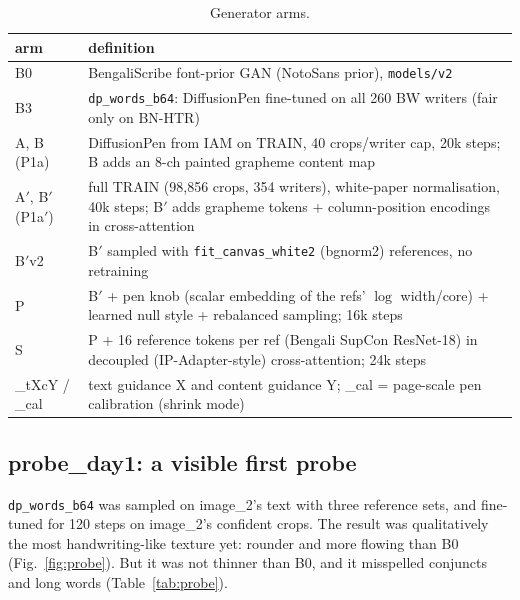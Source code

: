 \documentclass[10.5pt,a4paper]{article}
\newcommand{\Bp}{B$'$}
\newcommand{\Ap}{A$'$}
\begin{document}
\begin{table}[H]
\centering
\caption{Generator arms.}
\label{tab:armlist}
\small
\begin{tabular}{@{}lp{12.6cm}@{}}
\toprule
arm & definition \\
\midrule
B0 & BengaliScribe font-prior GAN (NotoSans prior), \texttt{models/v2} \\
B3 & \texttt{dp\_words\_b64}: DiffusionPen fine-tuned on all 260 BW writers (fair only on BN-HTR) \\
A, B (P1a) & DiffusionPen from IAM on TRAIN, 40 crops/writer cap, 20k steps; B adds an 8-ch painted grapheme content map \\
\Ap, \Bp{} (P1a$'$) & full TRAIN (98,856 crops, 354 writers), white-paper normalisation, 40k steps; \Bp{} adds grapheme tokens + column-position encodings in cross-attention \\
\Bp{}v2 & \Bp{} sampled with \texttt{fit\_canvas\_white2} (bgnorm2) references, no retraining \\
P & \Bp{} + pen knob (scalar embedding of the refs' $\log$ width/core) + learned null style + rebalanced sampling; 16k steps \\
S & P + 16 reference tokens per ref (Bengali SupCon ResNet-18) in decoupled (IP-Adapter-style) cross-attention; 24k steps \\
\_tXcY / \_cal & text guidance X and content guidance Y; \_cal = page-scale pen calibration (shrink mode) \\
\bottomrule
\end{tabular}
\end{table}

\subsection{probe\_day1: a visible first probe}
\texttt{dp\_words\_b64} was sampled on image\_2's text with three reference sets, and fine-tuned for 120 steps on image\_2's
confident crops. The result was qualitatively the most handwriting-like texture yet: rounder and more flowing than B0
(Fig.~\ref{fig:probe}). But it was not thinner than B0, and it misspelled conjuncts and long words (Table~\ref{tab:probe}).
\end{document}
